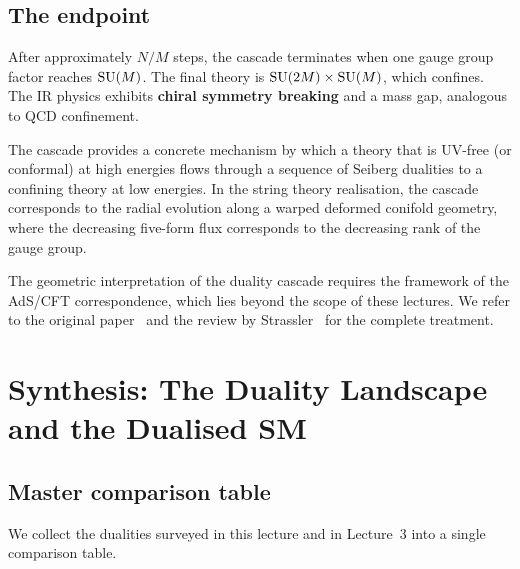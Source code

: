 \documentclass[11pt,a4paper]{article}
\begin{document}
\subsection{The endpoint}

After approximately $N/M$ steps, the cascade terminates when one
gauge group factor reaches $\mathrm{SU}(M)$.  The final theory is
$\mathrm{SU}(2M) \times \mathrm{SU}(M)$, which confines.  The IR physics exhibits
\textbf{chiral symmetry breaking} and a mass gap, analogous to
QCD confinement.

The cascade provides a concrete mechanism by which a theory that is
UV-free (or conformal) at high energies flows through a sequence of
Seiberg dualities to a confining theory at low energies.
In the string theory realisation, the cascade corresponds to the
radial evolution along a warped deformed conifold geometry, where
the decreasing five-form flux corresponds to the decreasing rank of
the gauge group.

\begin{remark}
The geometric interpretation of the duality cascade requires the
framework of the AdS/CFT correspondence, which lies beyond the scope
of these lectures.  We refer to the original
paper~\cite{KlebanovStrassler2000} and the review
by Strassler~\cite{Strassler2005} for the complete treatment.
\end{remark}


\section{Synthesis: The Duality Landscape and the Dualised SM}
\label{sec:synthesis}

\subsection{Master comparison table}

We collect the dualities surveyed in this lecture and in Lecture~3
into a single comparison table.
\end{document}
